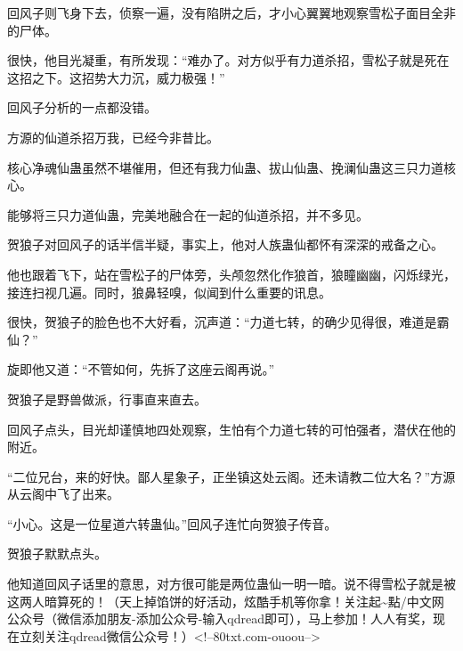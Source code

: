 \begin{this_body}
回风子则飞身下去，侦察一遍，没有陷阱之后，才小心翼翼地观察雪松子面目全非的尸体。

很快，他目光凝重，有所发现：“难办了。对方似乎有力道杀招，雪松子就是死在这招之下。这招势大力沉，威力极强！”

回风子分析的一点都没错。

方源的仙道杀招万我，已经今非昔比。

核心净魂仙蛊虽然不堪催用，但还有我力仙蛊、拔山仙蛊、挽澜仙蛊这三只力道核心。

能够将三只力道仙蛊，完美地融合在一起的仙道杀招，并不多见。

贺狼子对回风子的话半信半疑，事实上，他对人族蛊仙都怀有深深的戒备之心。

他也跟着飞下，站在雪松子的尸体旁，头颅忽然化作狼首，狼瞳幽幽，闪烁绿光，接连扫视几遍。同时，狼鼻轻嗅，似闻到什么重要的讯息。

很快，贺狼子的脸色也不大好看，沉声道：“力道七转，的确少见得很，难道是霸仙？”

旋即他又道：“不管如何，先拆了这座云阁再说。”

贺狼子是野兽做派，行事直来直去。

回风子点头，目光却谨慎地四处观察，生怕有个力道七转的可怕强者，潜伏在他的附近。

“二位兄台，来的好快。鄙人星象子，正坐镇这处云阁。还未请教二位大名？”方源从云阁中飞了出来。

“小心。这是一位星道六转蛊仙。”回风子连忙向贺狼子传音。

贺狼子默默点头。

他知道回风子话里的意思，对方很可能是两位蛊仙一明一暗。说不得雪松子就是被这两人暗算死的！（天上掉馅饼的好活动，炫酷手机等你拿！关注起\~{}點/中文网公众号（微信添加朋友-添加公众号-输入qdread即可），马上参加！人人有奖，现在立刻关注qdread微信公众号！）<!--80txt.com-ouoou-->

\end{this_body}

